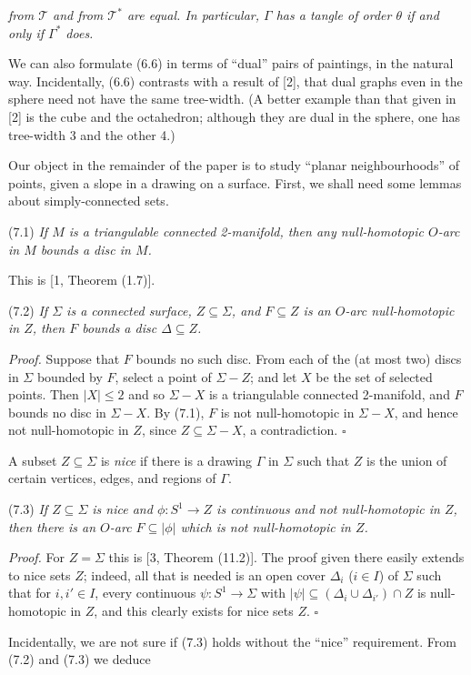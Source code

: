 \noindent \textit{from $\mathscr{T}$ and from $\mathscr{T}^*$ are equal. In particular, $\Gamma$ has a tangle of order $\theta$ if and only if $\Gamma^*$ does.}

We can also formulate (6.6) in terms of ``dual'' pairs of paintings, in the natural way. Incidentally, (6.6) contrasts with a result of [2], that dual graphs even in the sphere need not have the same tree-width. (A better example than that given in [2] is the cube and the octahedron; although they are dual in the sphere, one has tree-width 3 and the other 4.)


Our object in the remainder of the paper is to study ``planar neighbourhoods'' of points, given a slope in a drawing on a surface. First, we shall need some lemmas about simply-connected sets.

\stmt
(7.1) \textit{If $M$ is a triangulable connected 2-manifold, then any null-homotopic $O$-arc in $M$ bounds a disc in $M$.}

This is [1, Theorem (1.7)].

\stmt
(7.2) \textit{If $\Sigma$ is a connected surface, $Z \subseteq \Sigma$, and $F \subseteq Z$ is an $O$-arc null-homotopic in $Z$, then $F$ bounds a disc $\Delta \subseteq Z$.}

\textit{Proof.} Suppose that $F$ bounds no such disc. From each of the (at most two) discs in $\Sigma$ bounded by $F$, select a point of $\Sigma - Z$; and let $X$ be the set of selected points. Then $|X| \le 2$ and so $\Sigma - X$ is a triangulable connected 2-manifold, and $F$ bounds no disc in $\Sigma - X$. By (7.1), $F$ is not null-homotopic in $\Sigma - X$, and hence not null-homotopic in $Z$, since $Z \subseteq \Sigma - X$, a contradiction. $\square$

A subset $Z \subseteq \Sigma$ is \textit{nice} if there is a drawing $\Gamma$ in $\Sigma$ such that $Z$ is the union of certain vertices, edges, and regions of $\Gamma$.

\stmt
(7.3) \textit{If $Z \subseteq \Sigma$ is nice and $\phi \colon S^1 \to Z$ is continuous and not null-homotopic in $Z$, then there is an $O$-arc $F \subseteq |\phi|$ which is not null-homotopic in $Z$.}

\textit{Proof.} For $Z = \Sigma$ this is [3, Theorem (11.2)]. The proof given there easily extends to nice sets $Z$; indeed, all that is needed is an open cover $\Delta_i$ ($i \in I$) of $\Sigma$ such that for $i, i' \in I$, every continuous $\psi \colon S^1 \to \Sigma$ with $|\psi| \subseteq (\Delta_i \cup \Delta_{i'}) \cap Z$ is null-homotopic in $Z$, and this clearly exists for nice sets $Z$. $\square$

Incidentally, we are not sure if (7.3) holds without the ``nice'' requirement. From (7.2) and (7.3) we deduce
